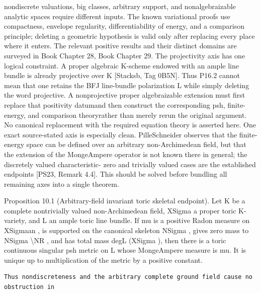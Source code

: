 \documentclass[
  10pt,
]{article}
\begin{document}
nondiscrete valuations, big classes, arbitrary support, and
nonalgebraizable analytic spaces require different inputs. The known
variational proofs use compactness, envelope regularity,
differentiability of energy, and a comparison principle; deleting a
geometric hypothesis is valid only after replacing every place where it
enters. The relevant positive results and their distinct domains are
surveyed in Book Chapter 28, Book Chapter 29. The projectivity axis has
one logical constraint. A proper algebraic K-scheme endowed with an
ample line bundle is already projective over K {[}Stacksb, Tag 0B5N{]}.
Thus P16.2 cannot mean that one retains the BFJ line-bundle polarization
L while simply deleting the word projective. A nonprojective proper
algebraizable extension must first replace that positivity datumand then
construct the corresponding psh, finite-energy, and comparison
theoryrather than merely rerun the original argument. No canonical
replacement with the required equation theory is asserted here. One
exact source-stated axis is especially clean. PilleSchneider observes
that the finite- energy space can be defined over an arbitrary
non-Archimedean field, but that the extension of the MongeAmpere
operator is not known there in general; the discretely valued
characteristic- zero and trivially valued cases are the established
endpoints {[}PS23, Remark 4.4{]}. This should be solved before bundling
all remaining axes into a single theorem.

Proposition 10.1 (Arbitrary-field invariant toric skeletal endpoint).
Let K be a complete nontrivially valued non-Archimedean field, XSigma a
proper toric K-variety, and L an ample toric line bundle. If mu is a
positive Radon measure on XSigmaan , is supported on the canonical
skeleton NSigma , gives zero mass to NSigma \textbackslash NR , and has
total mass degL (XSigma ), then there is a toric continuous singular psh
metric on L whose MongeAmpere measure is mu. It is unique up to
multiplication of the metric by a positive constant.

\begin{verbatim}
Thus nondiscreteness and the arbitrary complete ground field cause no obstruction in
\end{verbatim}
\end{document}
